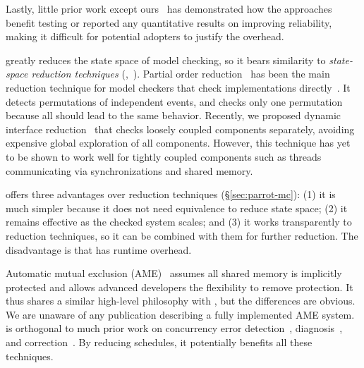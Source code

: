 Lastly, little prior work except ours~\cite{wu:pldi12} has demonstrated how the
approaches benefit testing or reported any quantitative results on
improving reliability, making it difficult for potential adopters to
justify the overhead.

 \parrot greatly reduces the state space of
model checking, so it bears similarity to \emph{state-space reduction
  techniques} (\eg,~\cite{godefroid:verisoft, flanagan:dynamicpo,
  demeter:sosp11}).  Partial order
reduction~\cite{godefroid:verisoft, flanagan:dynamicpo} has been the main
reduction technique for model checkers that check implementations
directly~\cite{modist:nsdi09, dbug:spin11}.  It detects
permutations of independent events, and checks only one permutation
because all should lead to the same behavior.  Recently, we proposed
dynamic interface reduction~\cite{demeter:sosp11} that checks loosely
coupled components separately, avoiding expensive global exploration of
all components.  However, this technique has yet to be shown to work well
for tightly coupled components such as threads communicating
via synchronizations and shared memory.

\parrot offers three advantages over reduction techniques
(\S\ref{sec:parrot-mc}): (1) it is much simpler because it does not
need equivalence to reduce state space; (2) it remains effective as the
checked system scales; and (3) it works transparently to reduction
techniques, so it can be combined with them for further reduction.  The
disadvantage is that \parrot has runtime overhead.

 Automatic mutual exclusion (AME)~\cite{ame:hotos07} assumes all shared
memory is implicitly protected and allows advanced developers the
flexibility to remove protection.  It thus shares a similar high-level
philosophy with \parrot, but the differences are obvious.  We are unaware of
any publication describing a fully implemented AME system. \parrot is
orthogonal to much prior work on concurrency error
detection~\cite{yu:racetrack:sosp,savage:eraser,racerx:sosp03,lu:muvi:sosp,avio:asplos06,conmem:asplos10},
diagnosis~\cite{racefuzzer:pldi08,ctrigger:asplos09,atomfuzzer:fse08}, and
correction~\cite{dimmunix:osdi08,gadara:osdi08,wu:loom:osdi10,cfix:osdi12}. By
reducing schedules, it potentially benefits all these techniques.

